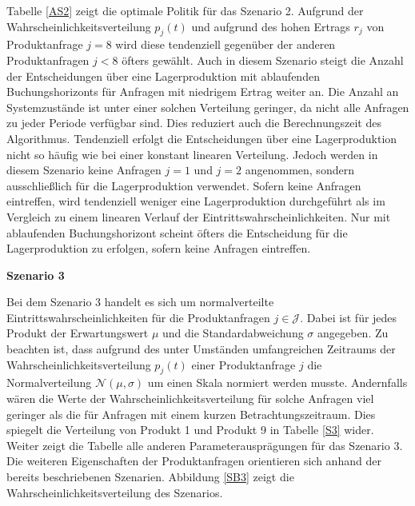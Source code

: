Tabelle \ref{AS2} zeigt die optimale Politik für das Szenario 2. Aufgrund der Wahrscheinlichkeitsverteilung $p_j(t)$ und aufgrund des hohen Ertrags $r_j$ von Produktanfrage $j=8$ wird diese tendenziell gegenüber der anderen Produktanfragen $j<8$ öfters gewählt. Auch in diesem Szenario steigt die Anzahl der Entscheidungen über eine Lagerproduktion mit ablaufenden Buchungshorizonts für Anfragen mit niedrigem Ertrag weiter an. Die Anzahl an Systemzustände ist unter einer solchen Verteilung geringer, da nicht alle Anfragen zu jeder Periode verfügbar sind. Dies reduziert auch die Berechnungszeit des Algorithmus. Tendenziell erfolgt die Entscheidungen über eine Lagerproduktion nicht so häufig wie bei einer konstant linearen Verteilung. Jedoch werden in diesem Szenario keine Anfragen $j=1$ und $j=2$ angenommen, sondern ausschließlich für die Lagerproduktion verwendet. Sofern keine Anfragen eintreffen, wird tendenziell weniger eine Lagerproduktion durchgeführt als im Vergleich zu einem linearen Verlauf der Eintrittswahrscheinlichkeiten. Nur mit ablaufenden Buchungshorizont scheint öfters die Entscheidung für die Lagerproduktion zu erfolgen, sofern keine Anfragen eintreffen.

\textbf{Szenario 3}

Bei dem Szenario 3 handelt es sich um normalverteilte Eintrittswahrscheinlichkeiten für die Produktanfragen $j\in\mathcal{J}$. Dabei ist für jedes Produkt der Erwartungswert $\mu$ und die Standardabweichung $\sigma$ angegeben. Zu beachten ist, dass aufgrund des unter Umständen umfangreichen Zeitraums der Wahrscheinlichkeitsverteilung $p_j(t)$ einer Produktanfrage $j$ die Normalverteilung $\mathcal{N}(\mu,\sigma)$ um einen Skala normiert werden musste. Andernfalls wären die Werte der Wahrscheinlichkeitsverteilung für solche Anfragen viel geringer als die für Anfragen mit einem kurzen Betrachtungszeitraum. Dies spiegelt die Verteilung von Produkt 1 und Produkt 9 in Tabelle \ref{S3} wider. Weiter zeigt die Tabelle alle anderen Parameterausprägungen für das Szenario 3. Die weiteren Eigenschaften der Produktanfragen orientieren sich anhand der bereits beschriebenen Szenarien. Abbildung \ref{SB3} zeigt die Wahrscheinlichkeitsverteilung des Szenarios.

